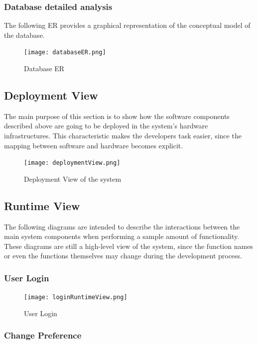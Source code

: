 \documentclass[12pt]{article}
\begin{document}
\subsubsection{Database detailed analysis}
The following ER provides a graphical representation of the conceptual model of the database.

\begin{figure}[H]
    \centering
    \texttt{[image: databaseER.png]}
    \caption{Database ER}
    \label{fig:databaseER}
\end{figure}

\subsection{Deployment View}
The main purpose of this section is to show how the software components described above are going to be deployed in the system's hardware infrastructures. This characteristic makes the developers task easier, since the mapping between software and hardware becomes explicit.

\begin{figure}[H]
    \centering
    \texttt{[image: deploymentView.png]}
    \caption{Deployment View of the system}
    \label{fig:componentView}
\end{figure}


\subsection{Runtime View}
The following diagrams are intended to describe the interactions between the main system components when performing a sample amount of functionality. These diagrams are still a high-level view of the system, since the function names or even the functions themselves may change during the development process.
\subsubsection{User Login}

\begin{figure}[H]
    \centering
    \texttt{[image: loginRuntimeView.png]}
    \caption{User Login}
    \label{fig:loginRuntime}
\end{figure}

\subsubsection{Change Preference}
\end{document}
